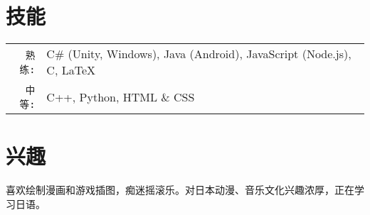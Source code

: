 \documentclass[UTF8]{ctexart}
\begin{document}
	\section{技能}
	\smallskip
	\noindent
	\begin{tabularx}{\linewidth}{r X}
		\texttt{熟练:} & C\# (Unity, Windows), Java (Android), JavaScript (Node.js), C, \LaTeX \\
		\texttt{中等:} & C++, Python, HTML \& CSS
	\end{tabularx}
	
	\smallskip
	
	\section{兴趣}
	\smallskip
	\noindent
	喜欢绘制漫画和游戏插图，痴迷摇滚乐。对日本动漫、音乐文化兴趣浓厚，正在学习日语。
\end{document}
